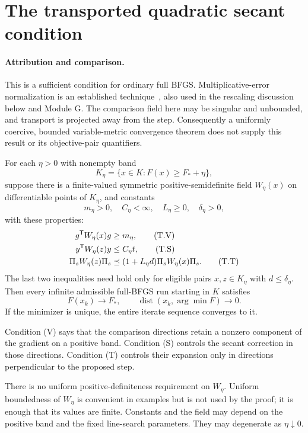 \section{The transported quadratic secant condition}
\paragraph{Attribution and comparison.}
This is a sufficient condition for ordinary full BFGS. Multiplicative-error normalization is an established technique~\cite[Lemmas 2.2--2.3]{FND_CV13}, also used in the rescaling discussion below and Module G. The comparison field here may be singular and unbounded, and transport is projected away from the step. Consequently a uniformly coercive, bounded variable-metric convergence theorem does not supply this result or its objective-pair quantifiers.

\begin{theorem}
For each $\eta>0$ with nonempty band
\[
 K_\eta=\{x\in K:F(x)\ge F_*+\eta\},
\]
suppose there is a finite-valued symmetric positive-semidefinite field $W_\eta(x)$ on differentiable points of $K_\eta$, and constants
\[
 m_\eta>0,\quad C_\eta<\infty,\quad L_\eta\ge0,\quad \delta_\eta>0,
\]
with these properties:
\begin{align}
 g^{\mathsf T} W_\eta(x)g&\ge m_\eta, \tag{T.V}\\
 y^{\mathsf T} W_\eta(z)y&\le C_\eta t, \tag{T.S}\\
 \Pi_s W_\eta(z)\Pi_s&\preceq
 (1+L_\eta d)\Pi_s W_\eta(x)\Pi_s. \tag{T.T}
\end{align}
The last two inequalities need hold only for eligible pairs $x,z\in K_\eta$ with $d\le\delta_\eta$. Then every infinite admissible full-BFGS run starting in $K$ satisfies
\[
 F(x_k)\to F_*,\qquad \operatorname{dist}(x_k,\arg\min F)\to0.
\]
If the minimizer is unique, the entire iterate sequence converges to it.
\end{theorem}
Condition (V) says that the comparison directions retain a nonzero component of the gradient on a positive band. Condition (S) controls the secant correction in those directions. Condition (T) controls their expansion only in directions perpendicular to the proposed step.

There is no uniform positive-definiteness requirement on $W_\eta$. Uniform boundedness of $W_\eta$ is convenient in examples but is not used by the proof; it is enough that its values are finite. Constants and the field may depend on the positive band and the fixed line-search parameters. They may degenerate as $\eta\downarrow0$.

